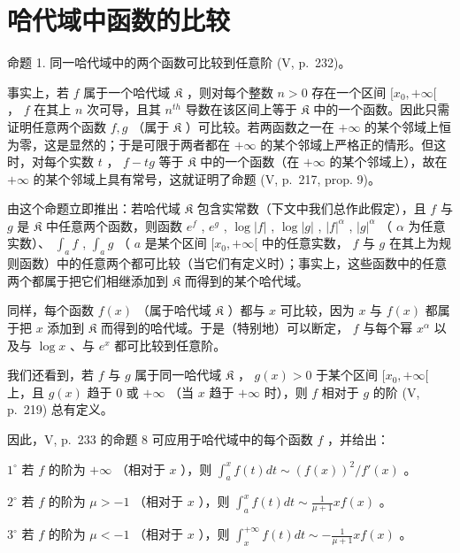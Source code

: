 \section{哈代域中函数的比较}

命题 1. 同一哈代域中的两个函数可比较到任意阶 (V, p.~232)。

事实上，若 \(f\) 属于一个哈代域 \(\mathfrak{K}\) ，则对每个整数 \(n > 0\) 存在一个区间 \([x_0, +\infty[\) ， \(f\) 在其上 \(n\) 次可导，且其 \(n^{th}\) 导数在该区间上等于 \(\mathfrak{K}\) 中的一个函数。因此只需证明任意两个函数 \(f, g\) （属于 \(\mathfrak{K}\) ）可比较。若两函数之一在 \(+\infty\) 的某个邻域上恒为零，这是显然的；于是可限于两者都在 \(+\infty\) 的某个邻域上严格正的情形。但这时，对每个实数 \(t\) ， \(f - tg\) 等于 \(\mathfrak{K}\) 中的一个函数（在 \(+\infty\) 的某个邻域上），故在 \(+\infty\) 的某个邻域上具有常号，这就证明了命题 (V, p.~217, prop. 9)。

由这个命题立即推出：若哈代域 \(\mathfrak{K}\) 包含实常数（下文中我们总作此假定），且 \(f\) 与 \(g\) 是 \(\mathfrak{K}\) 中任意两个函数，则函数 \(e^f\) , \(e^g\) , \(\log |f|\) , \(\log |g|\) , \(|f|^{\alpha}\) , \(|g|^{\alpha}\) （ \(\alpha\) 为任意实数）、 \(\int_{a} f\) , \(\int_{a} g\) （ \(a\) 是某个区间 \([x_0, +\infty[\) 中的任意实数， \(f\) 与 \(g\) 在其上为规则函数）中的任意两个都可比较（当它们有定义时）；事实上，这些函数中的任意两个都属于把它们相继添加到 \(\mathfrak{K}\) 而得到的某个哈代域。

同样，每个函数 \(f(x)\) （属于哈代域 \(\mathfrak{K}\) ）都与 \(x\) 可比较，因为 \(x\) 与 \(f(x)\) 都属于把 \(x\) 添加到 \(\mathfrak{K}\) 而得到的哈代域。于是（特别地）可以断定， \(f\) 与每个幂 \(x^{\alpha}\) 以及与 \(\log x\) 、与 \(e^{x}\) 都可比较到任意阶。

我们还看到，若 \(f\) 与 \(g\) 属于同一哈代域 \(\mathfrak{K}\) ， \(g(x) > 0\) 于某个区间 \([x_0, +\infty[\) 上，且 \(g(x)\) 趋于 0 或 \(+\infty\) （当 \(x\) 趋于 \(+\infty\) 时），则 \(f\) 相对于 \(g\) 的阶 (V, p.~219) 总有定义。

因此，V, p.~233 的命题 8 可应用于哈代域中的每个函数 \(f\) ，并给出：

\(1^{\circ}\) 若 \(f\) 的阶为 \(+\infty\) （相对于 \(x\) ），则 \(\int_{a}^{x} f(t) dt \sim (f(x))^{2} / f'(x)\) 。

\(2^{\circ}\) 若 \(f\) 的阶为 \(\mu > -1\) （相对于 \(x\) ），则 \(\int_{a}^{x} f(t) dt \sim \frac{1}{\mu + 1} xf(x)\) 。

\(3^{\circ}\) 若 \(f\) 的阶为 \(\mu < -1\) （相对于 \(x\) ），则 \(\int_{x}^{+\infty} f(t) dt \sim -\frac{1}{\mu + 1} xf(x)\) 。

